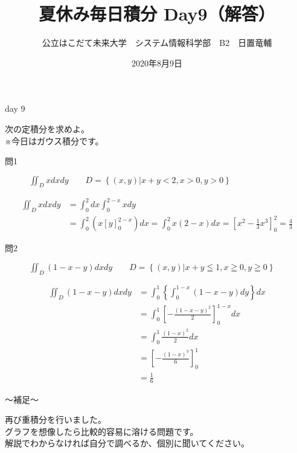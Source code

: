 \documentclass[dvipdfmx,uplatex]{jsarticle}
\title{夏休み毎日積分 Day9（解答）}
\author{公立はこだて未来大学　システム情報科学部　B2　日置竜輔}
\date{2020年8月9日}
\begin{document}
\maketitle

\begin{itembox}{day 9}
    \begin{center}
        次の定積分を求めよ。\\
        ※今日はガウス積分です。
    \end{center}
\end{itembox}

\begin{description}
    \item [問1] $\displaystyle \iint_D xdxdy \qquad D = \left\{(x, y) | x + y < 2 , x > 0, y > 0 \right\} $
\end{description}

\begin{align*}
    \iint_D xdxdy &= \int_0^2 dx \int_0^{2-x} xdy \\
    &= \int_0^2 \left(x\left[y\right]_0^{2-x}\right)dx = \int_0^2 x\left(2 - x\right) dx = \left[x^2 - \frac{1}{3}x^3\right]_0^2  = \frac{4}{3}
\end{align*}

\begin{description}
    \item [問2] $\displaystyle \iint_D (1 - x - y)dxdy \qquad D = \left\{ (x, y) | x + y \leqq  1 , x \geqq 0, y \geqq 0 \right\}$
\end{description}

\begin{align*}
    \iint_D (1 - x - y)dxdy &= \int_0^1 \left\{\int_0^{1-x} (1 - x - y)dy\right\}dx\\
    &= \int_0^1 \left[-\frac{(1 - x - y)^2}{2}\right]_0^{1-x} dx \\
    &= \int_0^1 \frac{(1-x)^2}{2} dx \\
    &= \left[ - \frac{(1-x)^3}{6}\right]_0^1\\
    &= \frac{1}{6}
\end{align*}

\newpage

\begin{boxnote}
    〜補足〜
    \begin{center}
        再び重積分を行いました。\\
        グラフを想像したら比較的容易に溶ける問題です。\\
        解説でわからなければ自分で調べるか、個別に聞いてください。
    \end{center}
\end{boxnote}
\end{document}
